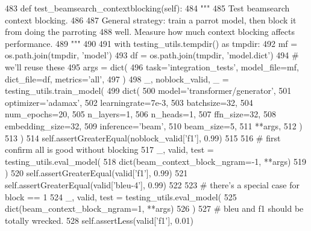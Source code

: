 \begin{DoxyCode}
483     \textcolor{keyword}{def }test\_beamsearch\_contextblocking(self):
484         \textcolor{stringliteral}{"""}
485 \textcolor{stringliteral}{        Test beamsearch context blocking.}
486 \textcolor{stringliteral}{}
487 \textcolor{stringliteral}{        General strategy: train a parrot model, then block it from doing the parroting}
488 \textcolor{stringliteral}{        well. Measure how much context blocking affects performance.}
489 \textcolor{stringliteral}{        """}
490 
491         with testing\_utils.tempdir() \textcolor{keyword}{as} tmpdir:
492             mf = os.path.join(tmpdir, \textcolor{stringliteral}{'model'})
493             df = os.path.join(tmpdir, \textcolor{stringliteral}{'model.dict'})
494             \textcolor{comment}{# we'll reuse these}
495             args = dict(
496                 task=\textcolor{stringliteral}{'integration\_tests'}, model\_file=mf, dict\_file=df, metrics=\textcolor{stringliteral}{'all'},
497             )
498             \_, noblock\_valid, \_ = testing\_utils.train\_model(
499                 dict(
500                     model=\textcolor{stringliteral}{'transformer/generator'},
501                     optimizer=\textcolor{stringliteral}{'adamax'},
502                     learningrate=7e-3,
503                     batchsize=32,
504                     num\_epochs=20,
505                     n\_layers=1,
506                     n\_heads=1,
507                     ffn\_size=32,
508                     embedding\_size=32,
509                     inference=\textcolor{stringliteral}{'beam'},
510                     beam\_size=5,
511                     **args,
512                 )
513             )
514             self.assertGreaterEqual(noblock\_valid[\textcolor{stringliteral}{'f1'}], 0.99)
515 
516             \textcolor{comment}{# first confirm all is good without blocking}
517             \_, valid, test = testing\_utils.eval\_model(
518                 dict(beam\_context\_block\_ngram=-1, **args)
519             )
520             self.assertGreaterEqual(valid[\textcolor{stringliteral}{'f1'}], 0.99)
521             self.assertGreaterEqual(valid[\textcolor{stringliteral}{'bleu-4'}], 0.99)
522 
523             \textcolor{comment}{# there's a special case for block == 1}
524             \_, valid, test = testing\_utils.eval\_model(
525                 dict(beam\_context\_block\_ngram=1, **args)
526             )
527             \textcolor{comment}{# bleu and f1 should be totally wrecked.}
528             self.assertLess(valid[\textcolor{stringliteral}{'f1'}], 0.01)

\end{DoxyCode}
